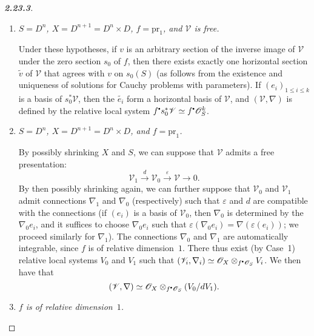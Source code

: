 \documentclass{report}
\theoremstyle{plain}
\theoremstyle{definition}
\newcommand{\sh}{\mathscr}
\newcommand{\sbullet}{{\mathbin{\vcenter{\hbox{\scalebox{.5}{$\bullet$}}}}}}
\newcommand{\pr}{\mathrm{pr}}
\renewcommand{\leq}{\leqslant}
\newcommand{\oldpage}[1]{\marginpar{\footnotesize$\Big\vert$ \textit{p.~#1}}}
\begin{document}
\begin{proof}[\normalfont\textbf{2.23.3}]
  \begin{enumerate}[\bf {Case}~1:]
    \item \emph{$S=D^n$, $X=D^{n+1}=D^n\times D$, $f=\pr_1$, and $\sh{V}$ is free.}

      Under these hypotheses, if $v$ is an arbitrary section of the inverse image of $\sh{V}$ under the zero section $s_0$ of $f$, then there exists exactly one horizontal section $\widetilde{v}$ of $\sh{V}$ that agrees with $v$ on $s_0(S)$ (as follows from the existence and uniqueness of solutions for Cauchy problems with parameters).
      If $(e_i)_{1\leq i\leq k}$ is a basis of $s_0^*\sh{V}$, then the $\widetilde{e_i}$ form a horizontal basis of $\sh{V}$, and $(\sh{V},{\nabla})$ is defined by the relative local system $f^\sbullet s_0^*\sh{V}\simeq f^\sbullet\sh{O}_S^k$.
    \item \emph{$S=D^n$, $X=D^{n+1}=D^n\times D$, and $f=\pr_1$.}

      By possibly shrinking $X$ and $S$, we can suppose that $\sh{V}$ admits a free presentation:
      \[
        \sh{V}_1 \xrightarrow{d} \sh{V}_0 \xrightarrow{\varepsilon} \sh{V} \to 0.
      \]
      By then possibly shrinking again, we can further suppose that $\sh{V}_0$ and $\sh{V}_1$ admit connections $\nabla_1$ and $\nabla_0$ (respectively) such that $\varepsilon$ and $d$ are compatible with the connections (if $(e_i)$ is a basis of $\sh{V}_0$, then $\nabla_0$ is determined by the $\nabla_0 e_i$, and it suffices to choose $\nabla_0 e_i$ such that $\varepsilon(\nabla_0 e_i)=\nabla(\varepsilon(e_i))$; we proceed similarly for $\nabla_1$).
      The connections $\nabla_0$ and $\nabla_1$ are automatically integrable, since $f$ is of relative dimension~$1$.
      There thus exist (by Case~1) relative local systems $V_0$ and $V_1$ such that $(\sh{V}_i,\nabla_i)\simeq\sh{O}_X\otimes_{f^\sbullet\sh{O}_S}V_i$.
      We then have that
      \[
        (\sh{V},\nabla) \simeq \sh{O}_X\otimes_{f^\sbullet\sh{O}_S}(V_0/dV_1).
      \]
\oldpage{18}
    \item \emph{$f$ is of relative dimension~$1$.}


\end{enumerate}
\end{proof}
\end{document}
